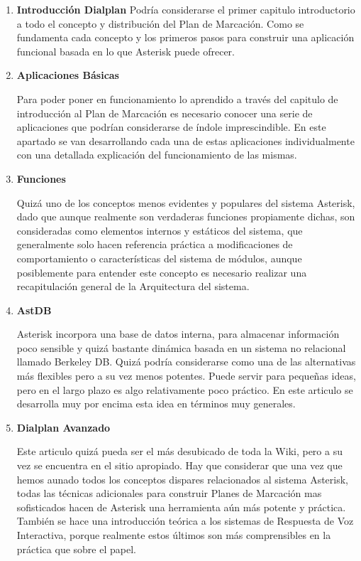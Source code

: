 \begin{enumerate}
	  \setlength{\itemsep}{10pt}

	\item \textbf{Introducción Dialplan}
	Podría considerarse el primer capitulo introductorio a todo el concepto y distribución del Plan de Marcación. Como se fundamenta cada concepto y los primeros pasos para construir una aplicación funcional basada en lo que Asterisk puede ofrecer. 
	
	\item \textbf{Aplicaciones Básicas}
	
	Para poder poner en funcionamiento lo aprendido a través del capitulo de introducción al Plan de Marcación es necesario conocer una serie de aplicaciones que podrían considerarse de índole imprescindible. En este apartado se van desarrollando cada una de estas aplicaciones individualmente con una detallada explicación del funcionamiento de las mismas.
	
	\item \textbf{Funciones}
	
	Quizá uno de los conceptos menos evidentes y populares del sistema Asterisk, dado que aunque realmente son verdaderas funciones propiamente dichas, son consideradas como elementos internos y estáticos del sistema, que generalmente solo hacen referencia práctica a modificaciones de comportamiento o características del sistema de módulos, aunque posiblemente para entender este concepto es necesario realizar una recapitulación general de la Arquitectura del sistema.
	
	\item \textbf{AstDB}
	
	Asterisk incorpora una base de datos interna, para almacenar información poco sensible y quizá bastante dinámica basada en un sistema no relacional llamado Berkeley DB. Quizá podría considerarse como una de las alternativas más flexibles pero a su vez menos potentes. Puede servir para pequeñas ideas, pero en el largo plazo es algo relativamente poco práctico. En este articulo se desarrolla muy por encima esta idea en términos muy generales.
	
  \item \textbf{Dialplan Avanzado}
	
	Este articulo quizá pueda ser el más desubicado de toda la Wiki, pero a su vez se encuentra en el sitio apropiado. Hay que considerar que una vez que hemos aunado todos los conceptos dispares relacionados al sistema Asterisk, todas las técnicas adicionales para construir Planes de Marcación mas sofisticados hacen de Asterisk una herramienta aún más potente y práctica. También se hace una introducción teórica a los sistemas de Respuesta de Voz Interactiva, porque realmente estos últimos son más comprensibles en la práctica que sobre el papel.
	
\end{enumerate}

